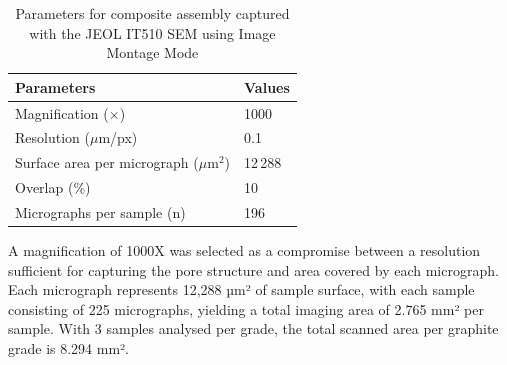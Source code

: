 \documentclass[review]{elsarticle}
\begin{document}
\begin{table}[ht]
  \centering
  \caption{Contrast (C) and Brightness (C) Summary by Sammple}
  \label{tab:contrast-brightness-summary}
\end{table}

\begin{table}
  \centering
  \caption{Parameters for composite assembly captured with the JEOL IT510 SEM using Image Montage Mode}
  \label{tab:microscopy_parameters}
  \begin{tabular}{l l}
    \hline
    Parameters & Values \\
    \hline
    Magnification ($\times$)                    & 1000 \\
    Resolution ($\mu$m/px)               & 0.1 \\
    Surface area per micrograph ($\mu$m$^2$) & 12\,288 \\
    Overlap (\%)                          & 10 \\
    Micrographs per sample (n)            & 196 \\
    \hline
  \end{tabular}%
\end{table}

A magnification of 1000X was selected as a compromise between a resolution
sufficient for capturing the pore structure and area covered by each micrograph.
Each micrograph represents 12,288 µm² of sample surface, with each sample
consisting of 225 micrographs, yielding a total imaging area of 2.765 mm² per
sample. With 3 samples analysed per grade, the total scanned area per graphite
grade is 8.294 mm². 
\end{document}
